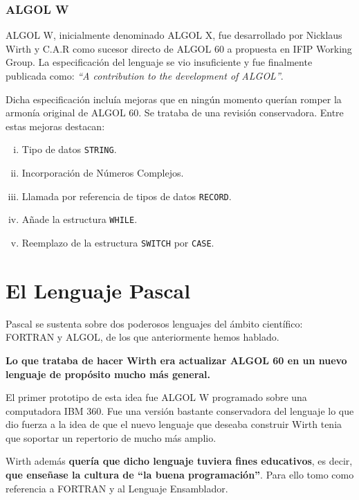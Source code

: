 \subsubsection{ALGOL W}

ALGOL W, inicialmente denominado ALGOL X, fue desarrollado por
Nicklaus Wirth y C.A.R como sucesor directo de ALGOL 60 a propuesta en
IFIP Working Group. La especificación del lenguaje se vio insuficiente
y fue finalmente publicada como: \textit{``A contribution to the development of
ALGOL''}. 

Dicha especificación incluía mejoras que en ningún momento querían romper la
armonía original de ALGOL 60. Se trataba de una revisión conservadora. Entre estas mejoras destacan:

\begin{enumerate}[i.]

\item Tipo de datos \texttt{STRING}.

\item Incorporación de Números Complejos.

\item Llamada por referencia de tipos de datos \texttt{RECORD}.

\item Añade la estructura \texttt{WHILE}.

\item Reemplazo de la estructura \texttt{SWITCH} por \texttt{CASE}.

\end{enumerate}

\section{El Lenguaje Pascal} 

Pascal se sustenta sobre dos poderosos lenguajes del ámbito científico:
FORTRAN y
ALGOL, de los que anteriormente hemos hablado.


\textbf{Lo que trataba de hacer Wirth era actualizar ALGOL 60 en un nuevo
lenguaje de propósito mucho más general.
}

El primer prototipo de esta idea fue ALGOL W programado sobre una computadora
IBM 360. Fue una versión bastante conservadora del lenguaje lo que dio
fuerza a la idea de que el nuevo lenguaje que deseaba construir Wirth tenia que
soportar un repertorio de mucho más amplio.

Wirth además \textbf{quería que dicho lenguaje tuviera fines educativos}, es
decir,
\textbf{que enseñase la cultura de ``la buena programación''}. Para ello tomo
como
referencia a FORTRAN y al Lenguaje Ensamblador.


